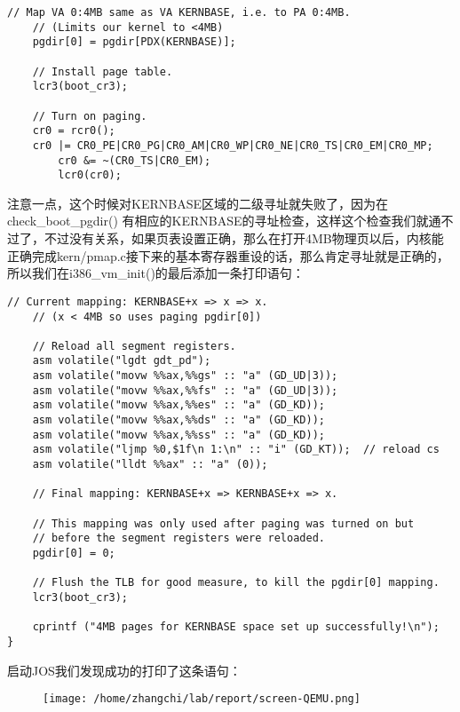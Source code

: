 \documentclass{article}
\newcommand{\funcname}[1]{{\ttfamily \small #1}}
\begin{document}
\begin{CJK*}{UTF8}{gkai}
\begin{lstlisting}[style=ccode, title={\scriptsize \ttfamily \bfseries kern/pmap.c: i386\_vm\_init ()}]
	// Map VA 0:4MB same as VA KERNBASE, i.e. to PA 0:4MB.
	// (Limits our kernel to <4MB)
	pgdir[0] = pgdir[PDX(KERNBASE)];

	// Install page table.
	lcr3(boot_cr3);

	// Turn on paging.
	cr0 = rcr0();
	cr0 |= CR0_PE|CR0_PG|CR0_AM|CR0_WP|CR0_NE|CR0_TS|CR0_EM|CR0_MP;
        cr0 &= ~(CR0_TS|CR0_EM);
        lcr0(cr0);
\end{lstlisting}

注意一点，这个时候对KERNBASE区域的二级寻址就失败了，因为在 \funcname{check\_boot\_pgdir()} 有相应的KERNBASE的寻址检查，这样这个检查我们就通不过了，不过没有关系，如果页表设置正确，那么在打开4MB物理页以后，内核能正确完成kern/pmap.c接下来的基本寄存器重设的话，那么肯定寻址就是正确的，所以我们在\funcname{i386\_vm\_init()}的最后添加一条打印语句：

\begin{lstlisting}[style=ccode, title={\scriptsize \ttfamily \bfseries kern/pmap.c: i386\_vm\_init ()}]
	// Current mapping: KERNBASE+x => x => x.
	// (x < 4MB so uses paging pgdir[0])

	// Reload all segment registers.
	asm volatile("lgdt gdt_pd");
	asm volatile("movw %%ax,%%gs" :: "a" (GD_UD|3));
	asm volatile("movw %%ax,%%fs" :: "a" (GD_UD|3));
	asm volatile("movw %%ax,%%es" :: "a" (GD_KD));
	asm volatile("movw %%ax,%%ds" :: "a" (GD_KD));
	asm volatile("movw %%ax,%%ss" :: "a" (GD_KD));
	asm volatile("ljmp %0,$1f\n 1:\n" :: "i" (GD_KT));  // reload cs
	asm volatile("lldt %%ax" :: "a" (0));

	// Final mapping: KERNBASE+x => KERNBASE+x => x.

	// This mapping was only used after paging was turned on but
	// before the segment registers were reloaded.
	pgdir[0] = 0;

	// Flush the TLB for good measure, to kill the pgdir[0] mapping.
	lcr3(boot_cr3);

    cprintf ("4MB pages for KERNBASE space set up successfully!\n");
}

\end{lstlisting}

启动JOS我们发现成功的打印了这条语句：

\begin{figure}[htp]
\centering
\texttt{[image: /home/zhangchi/lab/report/screen-QEMU.png]}
\end{figure}


\vspace{4em}



\end{CJK*}
\end{document}
